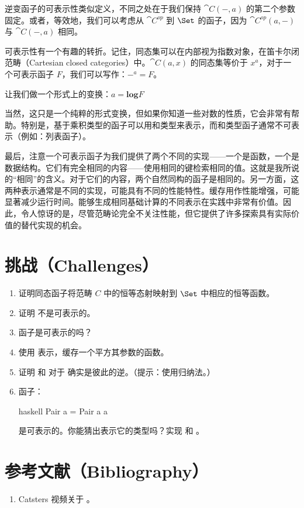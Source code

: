 逆变函子的可表示性类似定义，不同之处在于我们保持 $\cat{C}(-, a)$ 的第二个参数固定。或者，等效地，我们可以考虑从 $\cat{C}^\mathit{op}$ 到 $\Set$ 的函子，因为 $\cat{C}^\mathit{op}(a, -)$ 与 $\cat{C}(-, a)$ 相同。

可表示性有一个有趣的转折。记住，同态集可以在内部视为指数对象，在笛卡尔闭范畴（Cartesian closed categories）中。$\cat{C}(a, x)$ 的同态集等价于 $x^a$，对于一个可表示函子 $F$，我们可以写作：$-^a = F$。

让我们做一个形式上的变换：$a = \mathbf{log}F$

当然，这只是一个纯粹的形式变换，但如果你知道一些对数的性质，它会非常有帮助。特别是，基于乘积类型的函子可以用和类型来表示，而和类型函子通常不可表示（例如：列表函子）。

最后，注意一个可表示函子为我们提供了两个不同的实现——一个是函数，一个是数据结构。它们有完全相同的内容——使用相同的键检索相同的值。这就是我所说的“相同”的含义。对于它们的内容，两个自然同构的函子是相同的。另一方面，这两种表示通常是不同的实现，可能具有不同的性能特性。缓存用作性能增强，可能显著减少运行时间。能够生成相同基础计算的不同表示在实践中非常有价值。因此，令人惊讶的是，尽管范畴论完全不关注性能，但它提供了许多探索具有实际价值的替代实现的机会。

\section{挑战（Challenges）}

\begin{enumerate}
  \tightlist
  \item
  证明同态函子将范畴 $C$ 中的恒等态射映射到 $\Set$ 中相应的恒等函数。
  \item
  证明  不是可表示的。
  \item
   函子是可表示的吗？
  \item
  使用  表示，缓存一个平方其参数的函数。
  \item
  证明  和  对于  确实是彼此的逆。（提示：使用归纳法。）
  \item
  函子：

  \begin{snip}{haskell}
    Pair a = Pair a a
  \end{snip}
  是可表示的。你能猜出表示它的类型吗？实现  和 。
\end{enumerate}

\section{参考文献（Bibliography）}

\begin{enumerate}
  \tightlist
  \item
  Catsters 视频关于
  。
\end{enumerate}
